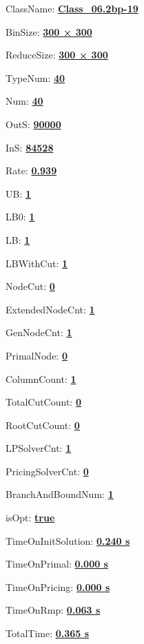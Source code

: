\documentclass[11pt]{article}
\begin{document}
\pagestyle{empty}


ClassName: \underline{\textbf{Class_06.2bp-19}}
\par
BinSize: \underline{\textbf{300 × 300}}
\par
ReduceSize: \underline{\textbf{300 × 300}}
\par
TypeNum: \underline{\textbf{40}}
\par
Num: \underline{\textbf{40}}
\par
OutS: \underline{\textbf{90000}}
\par
InS: \underline{\textbf{84528}}
\par
Rate: \underline{\textbf{0.939}}
\par
UB: \underline{\textbf{1}}
\par
LB0: \underline{\textbf{1}}
\par
LB: \underline{\textbf{1}}
\par
LBWithCut: \underline{\textbf{1}}
\par
NodeCut: \underline{\textbf{0}}
\par
ExtendedNodeCnt: \underline{\textbf{1}}
\par
GenNodeCnt: \underline{\textbf{1}}
\par
PrimalNode: \underline{\textbf{0}}
\par
ColumnCount: \underline{\textbf{1}}
\par
TotalCutCount: \underline{\textbf{0}}
\par
RootCutCount: \underline{\textbf{0}}
\par
LPSolverCnt: \underline{\textbf{1}}
\par
PricingSolverCnt: \underline{\textbf{0}}
\par
BranchAndBoundNum: \underline{\textbf{1}}
\par
isOpt: \underline{\textbf{true}}
\par
TimeOnInitSolution: \underline{\textbf{0.240 s}}
\par
TimeOnPrimal: \underline{\textbf{0.000 s}}
\par
TimeOnPricing: \underline{\textbf{0.000 s}}
\par
TimeOnRmp: \underline{\textbf{0.063 s}}
\par
TotalTime: \underline{\textbf{0.365 s}}
\par
\newpage
\end{document}
